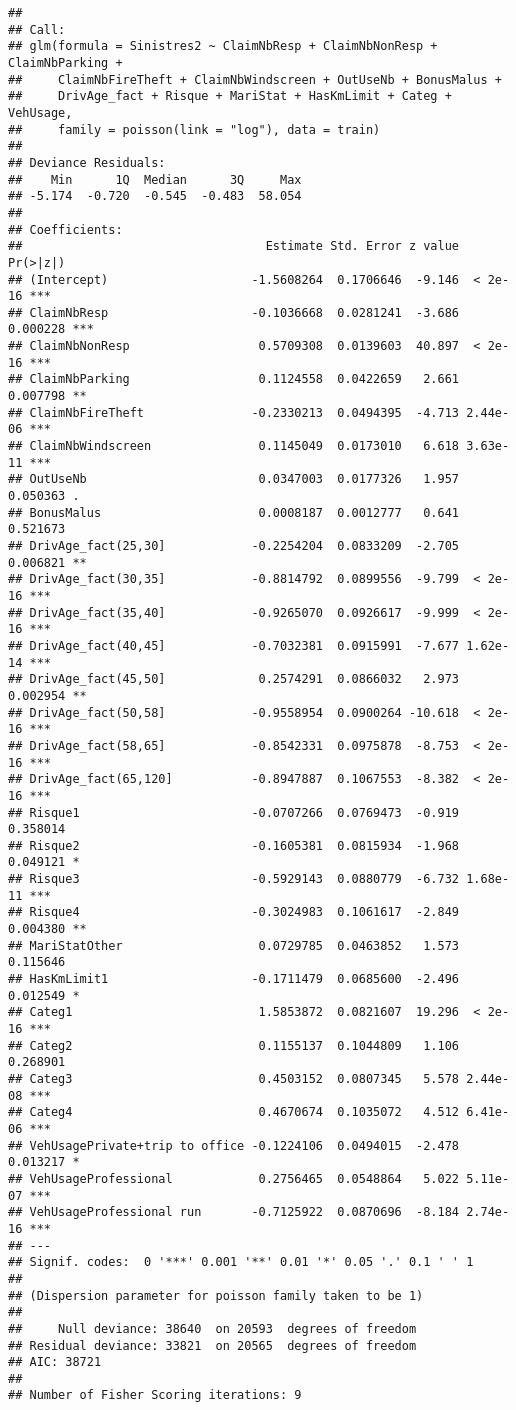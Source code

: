 \documentclass[
]{article}
\begin{document}
\begin{verbatim}
## 
## Call:
## glm(formula = Sinistres2 ~ ClaimNbResp + ClaimNbNonResp + ClaimNbParking + 
##     ClaimNbFireTheft + ClaimNbWindscreen + OutUseNb + BonusMalus + 
##     DrivAge_fact + Risque + MariStat + HasKmLimit + Categ + VehUsage, 
##     family = poisson(link = "log"), data = train)
## 
## Deviance Residuals: 
##    Min      1Q  Median      3Q     Max  
## -5.174  -0.720  -0.545  -0.483  58.054  
## 
## Coefficients:
##                                  Estimate Std. Error z value Pr(>|z|)    
## (Intercept)                    -1.5608264  0.1706646  -9.146  < 2e-16 ***
## ClaimNbResp                    -0.1036668  0.0281241  -3.686 0.000228 ***
## ClaimNbNonResp                  0.5709308  0.0139603  40.897  < 2e-16 ***
## ClaimNbParking                  0.1124558  0.0422659   2.661 0.007798 ** 
## ClaimNbFireTheft               -0.2330213  0.0494395  -4.713 2.44e-06 ***
## ClaimNbWindscreen               0.1145049  0.0173010   6.618 3.63e-11 ***
## OutUseNb                        0.0347003  0.0177326   1.957 0.050363 .  
## BonusMalus                      0.0008187  0.0012777   0.641 0.521673    
## DrivAge_fact(25,30]            -0.2254204  0.0833209  -2.705 0.006821 ** 
## DrivAge_fact(30,35]            -0.8814792  0.0899556  -9.799  < 2e-16 ***
## DrivAge_fact(35,40]            -0.9265070  0.0926617  -9.999  < 2e-16 ***
## DrivAge_fact(40,45]            -0.7032381  0.0915991  -7.677 1.62e-14 ***
## DrivAge_fact(45,50]             0.2574291  0.0866032   2.973 0.002954 ** 
## DrivAge_fact(50,58]            -0.9558954  0.0900264 -10.618  < 2e-16 ***
## DrivAge_fact(58,65]            -0.8542331  0.0975878  -8.753  < 2e-16 ***
## DrivAge_fact(65,120]           -0.8947887  0.1067553  -8.382  < 2e-16 ***
## Risque1                        -0.0707266  0.0769473  -0.919 0.358014    
## Risque2                        -0.1605381  0.0815934  -1.968 0.049121 *  
## Risque3                        -0.5929143  0.0880779  -6.732 1.68e-11 ***
## Risque4                        -0.3024983  0.1061617  -2.849 0.004380 ** 
## MariStatOther                   0.0729785  0.0463852   1.573 0.115646    
## HasKmLimit1                    -0.1711479  0.0685600  -2.496 0.012549 *  
## Categ1                          1.5853872  0.0821607  19.296  < 2e-16 ***
## Categ2                          0.1155137  0.1044809   1.106 0.268901    
## Categ3                          0.4503152  0.0807345   5.578 2.44e-08 ***
## Categ4                          0.4670674  0.1035072   4.512 6.41e-06 ***
## VehUsagePrivate+trip to office -0.1224106  0.0494015  -2.478 0.013217 *  
## VehUsageProfessional            0.2756465  0.0548864   5.022 5.11e-07 ***
## VehUsageProfessional run       -0.7125922  0.0870696  -8.184 2.74e-16 ***
## ---
## Signif. codes:  0 '***' 0.001 '**' 0.01 '*' 0.05 '.' 0.1 ' ' 1
## 
## (Dispersion parameter for poisson family taken to be 1)
## 
##     Null deviance: 38640  on 20593  degrees of freedom
## Residual deviance: 33821  on 20565  degrees of freedom
## AIC: 38721
## 
## Number of Fisher Scoring iterations: 9
\end{verbatim}
\end{document}

